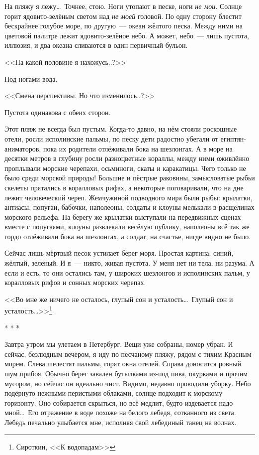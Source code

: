 \documentclass[openany, oneside]{book}
\begin{document}
На пляжу я лежу\dots \ Точнее, стою. Ноги утопают в песке, ноги \textit{не мои}. Солнце горит ядовито-зелёным светом над \textit{не моей} головой. По одну сторону блестит бескрайнее голубое море, по другую~--- океан жёлтого песка. Между ними на цветовой палитре лежит ядовито-зелёное небо. А может, небо~--- лишь пустота, иллюзия, и два океана сливаются в один первичный бульон.

<<На какой половине я нахожусь..?>>

Под ногами вода.

<<Смена перспективы. Но что изменилось..?>>

Пустота одинакова с обеих сторон.

Этот пляж не всегда был пустым. Когда-то давно, на нём стояли роскошные отели, росли исполинские пальмы, по песку дети радостно убегали от египтян-аниматоров, пока их родители отлёживали бока на шезлонгах. А в море на десятки метров в глубину росли разноцветные кораллы, между ними оживлённо проплывали морские черепахи, осьминоги, скаты и каракатицы. Чего только не было среди морской природы! Большие и пёстрые раковины, замысловатые рыбьи скелеты прятались в коралловых рифах, а некоторые поговаривали, что на дне лежит человеческий череп. Жемчужиной подводного мира были рыбы: крылатки, антиасы, попугаи, бабочки, наполеоны, солдаты и клоуны мелькали в расщелинах морского рельефа. На берегу же крылатки выступали на передвижных сценах вместе с попугаями, клоуны развлекали весёлую публику, наполеоны всё так же гордо отлёживали бока на шезлонгах, а солдат, на счастье, нигде видно не было.

Сейчас лишь мёртвый песок устилает берег моря. Простая картина: синий, жёлтый, зелёный. И я~--- никто, живая пустота. У меня нет ни тела, ни разума. А если и есть, то они остались там, у широких шезлонгов и исполинских пальм, у коралловых рифов и сонных морских черепах. 

<<Во мне же ничего не осталось, глупый сон и усталость\dots \ Глупый сон и усталость\dots>>\footnote{Сироткин, <<К водопадам>>}

\begin{center}
    * * *
\end{center}

Завтра утром мы улетаем в Петербург. Вещи уже собраны, номер убран. И сейчас, безлюдным вечером, я иду по песчаному пляжу, рядом с тихим Красным морем. Слева шелестят пальмы, горят окна отелей. Справа доносится ровный шум прибоя. Обычно берег завален бутылками из-под пива, окурками и прочим мусором, но сейчас он идеально чист. Видимо, недавно проводили уборку. Небо подёрнуто нежными перистыми облаками, солнце подходит к морскому горизонту. Оно собирается скрыться, но всё медлит, будто издевается надо мной\dots \ Его отражение в воде похоже на белого лебедя, сотканного из света. Лебедь печально улыбается мне, исполняя свой лебединый танец на волнах.
\end{document}
